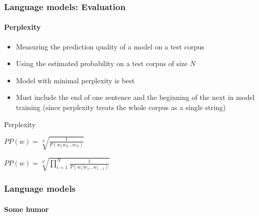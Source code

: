 \documentclass[xcolor=table]{beamer}
\begin{document}
\begin{frame}
\frametitle{Language models: Evaluation}
\framesubtitle{Perplexity}

\begin{itemize}
	\item Measuring the prediction quality of a model on a test corpus
	\item Using the estimated probability on a test corpus of size $N$
	\item Model with minimal perplexity is best
	\item Must include the end of one sentence and the beginning of the next in model training (since perplexity treats the whole corpus as a single string)
\end{itemize}

\begin{block}{Perplexity}
	\begin{center}
		$PP(w) = \sqrt[N]{\frac{1}{P(w_1 w_2 \ldots w_N)}}$
		
		$PP(w) = \sqrt[N]{\prod\limits_{i=1}^{N}\frac{1}{P(w_i | w_1 \ldots w_{i-1})}}$
	\end{center}
\end{block}

\end{frame}


\begin{frame}
\frametitle{Language models}
\framesubtitle{Some humor}

\begin{center}
\end{center}

\end{frame}

\end{document}
